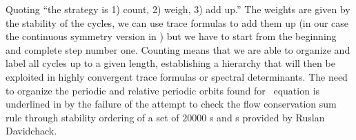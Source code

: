 Quoting  ``the strategy is 1) count, 2) weigh, 3) add up.''
The weights are given by the stability of the cycles, we can use trace formulas to add them up (in
our case the continuous symmetry version in ) but we have to start from the beginning
and complete step number one. Counting means that we are able to organize and label all cycles up
to a given length, establishing a hierarchy that will then be exploited in highly convergent trace
formulas or spectral determinants. The need to organize the periodic and relative periodic orbits 
found for \KS\ equation is underlined in  
by the failure of the attempt to check the flow conservation 
sum rule through stability ordering of a set of $20000$ {\po s} and {\rpo s} provided by
Ruslan Davidchack.



